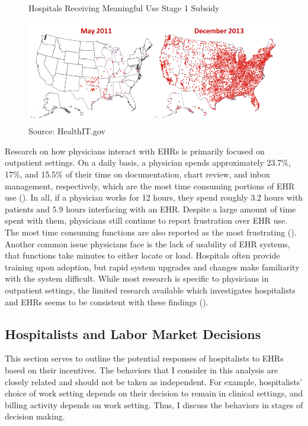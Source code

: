 \documentclass[12pt]{article}
\begin{document}
\begin{figure}[ht]
    \centering
    \captionsetup{width=.6\linewidth}
    \caption{Hospitals Receiving Meaningful Use Stage 1 Subsidy}
    \includegraphics[scale=.5]{graphics/QS-Hospitals-Receiving-Payments-for-MU-and-Adoption.png}
    \caption*{Source: HealthIT.gov}
    \label{fig:meanuse}
\end{figure}

Research on how physicians interact with EHRs is primarily focused on outpatient settings. On a daily basis, a physician spends approximately 23.7\%, 17\%, and 15.5\% of their time on documentation, chart review, and inbox management, respectively, which are the most time consuming portions of EHR use (\cite{arndt2017tethered}). In all, if a physician works for 12 hours, they spend roughly 3.2 hours with patients and 5.9 hours interfacing with an EHR. Despite a large amount of time spent with them, physicians still continue to report frustration over EHR use. The most time consuming functions are also reported as the most frustrating (\cite{dymek2021building}). Another common issue physicians face is the lack of usability of EHR systems, that functions take minutes to either locate or load. Hospitals often provide training upon adoption, but rapid system upgrades and changes make familiarity with the system difficult. While most research is specific to physicians in outpatient settings, the limited research available which investigates hospitalists and EHRs seems to be consistent with these findings (\cite{tipping2010did}). 

\subsection{Hospitalists and Labor Market Decisions}

This section serves to outline the potential responses of hospitalists to EHRs based on their incentives. The behaviors that I consider in this analysis are closely related and should not be taken as independent. For example, hospitalists' choice of work setting depends on their decision to remain in clinical settings, and billing activity depends on work setting. Thus, I discuss the behaviors in stages of decision making. 
\end{document}

